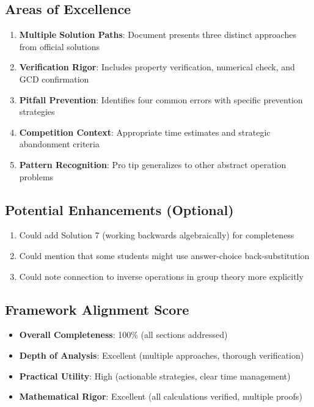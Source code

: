 \documentclass[11pt]{article}
\begin{document}
\subsection*{Areas of Excellence}
\begin{enumerate}
    \item \textbf{Multiple Solution Paths}: Document presents three distinct approaches from official solutions
    \item \textbf{Verification Rigor}: Includes property verification, numerical check, and GCD confirmation
    \item \textbf{Pitfall Prevention}: Identifies four common errors with specific prevention strategies
    \item \textbf{Competition Context}: Appropriate time estimates and strategic abandonment criteria
    \item \textbf{Pattern Recognition}: Pro tip generalizes to other abstract operation problems
\end{enumerate}

\subsection*{Potential Enhancements (Optional)}
\begin{enumerate}
    \item Could add Solution 7 (working backwards algebraically) for completeness
    \item Could mention that some students might use answer-choice back-substitution
    \item Could note connection to inverse operations in group theory more explicitly
\end{enumerate}

\subsection*{Framework Alignment Score}
\begin{itemize}[leftmargin=*]
    \item \textbf{Overall Completeness}: 100\% (all sections addressed)
    \item \textbf{Depth of Analysis}: Excellent (multiple approaches, thorough verification)
    \item \textbf{Practical Utility}: High (actionable strategies, clear time management)
    \item \textbf{Mathematical Rigor}: Excellent (all calculations verified, multiple proofs)
\end{itemize}
\end{document}
